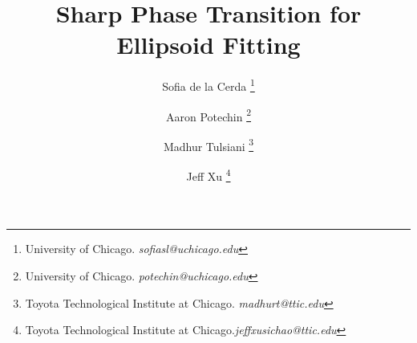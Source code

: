 \documentclass[12pt]{article}
\newcommand{\Lovasz}{Lov\'asz\xspace}
\newcommand{\Authornote}[3]{{\sf\footnotesize\color{#3}{[#1: #2]}}}
\newcommand{\Authornote}[3]{}
\newcommand{\snote}[1]{\Authornote{Sofia}{#1}{orange}}
\begin{document}
\title{Sharp Phase Transition for Ellipsoid Fitting}%
\author{
Sofia de la Cerda
\thanks{{University of Chicago}. \textit{sofiasl@uchicago.edu} }
\and 
Aaron Potechin 
\thanks{{University of Chicago}. \textit{potechin@uchicago.edu}}
\and
Madhur Tulsiani
\thanks{{Toyota Technological Institute at Chicago}. \textit{madhurt@ttic.edu}}
\and
Jeff Xu
\thanks{{Toyota Technological Institute at Chicago}.\textit{jeffxusichao@ttic.edu}}
}
\maketitle

\end{document}
